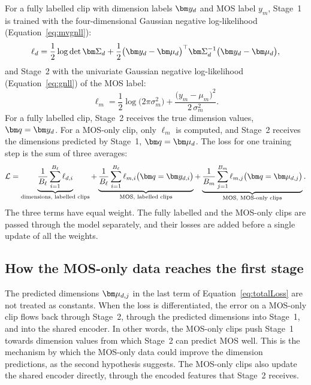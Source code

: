 \documentclass[
english,                 %
bibtex,                  %
includeExtraAbstracts, %
]{kththesis}
\numberwithin{listing}{chapter}
\begin{document}
For a fully labelled clip with dimension labels $\vect{y}_d$ and MOS label $y_m$, Stage~1 is trained with the four-dimensional Gaussian negative log-likelihood (Equation~\eqref{eq:mvgnll}):
\begin{equation}
  \ell_{d} = \frac{1}{2}\log\det\vect{\Sigma}_d + \frac{1}{2}\big(\vect{y}_d - \vect{\mu}_d\big)^{\top}\vect{\Sigma}_d^{-1}\big(\vect{y}_d - \vect{\mu}_d\big),
  \label{eq:dimLoss}
\end{equation}
and Stage~2 with the univariate Gaussian negative log-likelihood (Equation~\eqref{eq:gnll}) of the MOS label:
\begin{equation}
  \ell_{m} = \frac{1}{2}\log\big(2\pi\sigma_m^2\big) + \frac{\big(y_m - \mu_m\big)^2}{2\,\sigma_m^2}.
  \label{eq:mosLoss}
\end{equation}
For a fully labelled clip, Stage~2 receives the true dimension values, $\vect{q} = \vect{y}_d$. For a MOS-only clip, only $\ell_m$ is computed, and Stage~2 receives the dimensions predicted by Stage~1, $\vect{q} = \vect{\mu}_d$. The loss for one training step is the sum of three averages:
\begin{equation}
  \mathcal{L} =
  \underbrace{\frac{1}{B_\ell}\sum_{i=1}^{B_\ell} \ell_{d,i}}_{\text{dimensions, labelled clips}}
  + \underbrace{\frac{1}{B_\ell}\sum_{i=1}^{B_\ell} \ell_{m,i}\big(\vect{q} = \vect{y}_{d,i}\big)}_{\text{MOS, labelled clips}}
  + \underbrace{\frac{1}{B_m}\sum_{j=1}^{B_m} \ell_{m,j}\big(\vect{q} = \vect{\mu}_{d,j}\big)}_{\text{MOS, MOS-only clips}}.
  \label{eq:totalLoss}
\end{equation}
The three terms have equal weight. The fully labelled and the MOS-only clips are passed through the model separately, and their losses are added before a single update of all the weights.

\subsection{How the MOS-only data reaches the first stage}

The predicted dimensions $\vect{\mu}_{d,j}$ in the last term of Equation~\eqref{eq:totalLoss} are not treated as constants. When the loss is differentiated, the error on a MOS-only clip flows back through Stage~2, through the predicted dimensions into Stage~1, and into the shared encoder. In other words, the MOS-only clips push Stage~1 towards dimension values from which Stage~2 can predict MOS well. This is the mechanism by which the MOS-only data could improve the dimension predictions, as the second hypothesis suggests. The MOS-only clips also update the shared encoder directly, through the encoded features that Stage~2 receives.
\end{document}
